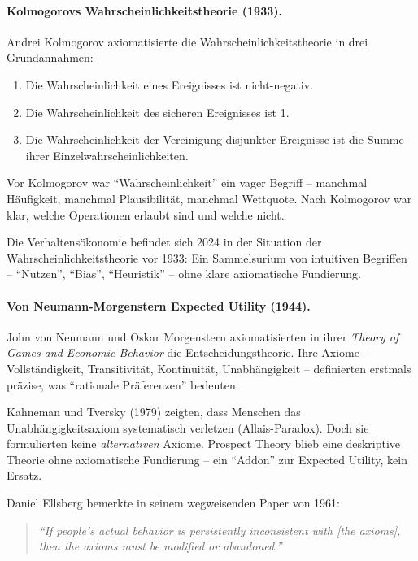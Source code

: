 \paragraph{Kolmogorovs Wahrscheinlichkeitstheorie (1933).}

Andrei Kolmogorov axiomatisierte die Wahrscheinlichkeitstheorie in drei Grundannahmen:
\begin{enumerate}
    \item Die Wahrscheinlichkeit eines Ereignisses ist nicht-negativ.
    \item Die Wahrscheinlichkeit des sicheren Ereignisses ist 1.
    \item Die Wahrscheinlichkeit der Vereinigung disjunkter Ereignisse ist die Summe ihrer Einzelwahrscheinlichkeiten.
\end{enumerate}

Vor Kolmogorov war ``Wahrscheinlichkeit'' ein vager Begriff -- manchmal Häufigkeit, manchmal Plausibilität, manchmal Wettquote. Nach Kolmogorov war klar, welche Operationen erlaubt sind und welche nicht.

Die Verhaltensökonomie befindet sich 2024 in der Situation der Wahrscheinlichkeitstheorie vor 1933: Ein Sammelsurium von intuitiven Begriffen -- ``Nutzen'', ``Bias'', ``Heuristik'' -- ohne klare axiomatische Fundierung.

\paragraph{Von Neumann-Morgenstern Expected Utility (1944).}

John von Neumann und Oskar Morgenstern axiomatisierten in ihrer \textit{Theory of Games and Economic Behavior} die Entscheidungstheorie. Ihre Axiome -- Vollständigkeit, Transitivität, Kontinuität, Unabhängigkeit -- definierten erstmals präzise, was ``rationale Präferenzen'' bedeuten.

Kahneman und Tversky (1979) zeigten, dass Menschen das Unabhängigkeitsaxiom systematisch verletzen (Allais-Paradox). Doch sie formulierten keine \textit{alternativen} Axiome. Prospect Theory blieb eine deskriptive Theorie ohne axiomatische Fundierung -- ein ``Addon'' zur Expected Utility, kein Ersatz.

Daniel Ellsberg bemerkte in seinem wegweisenden Paper von 1961:

\begin{quote}
\textit{``If people's actual behavior is persistently inconsistent with [the axioms], then the axioms must be modified or abandoned.''}
\end{quote}

